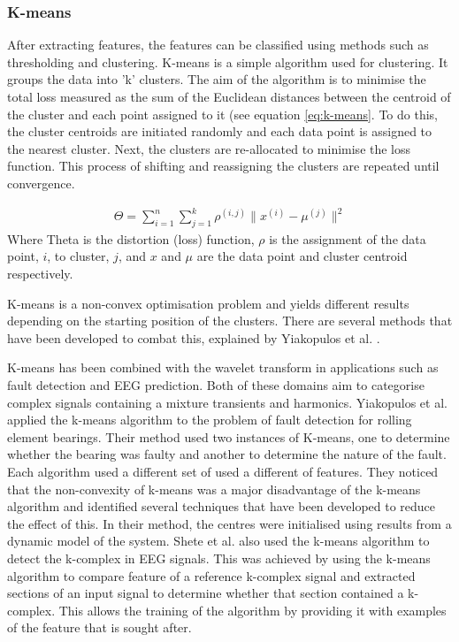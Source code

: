 \documentclass[reprint,NumberedRefs]{JASA}
\begin{document}
\subsubsection{K-means}
After extracting features, the features can be classified using methods such as thresholding and clustering. K-means is a simple algorithm used for clustering. It groups the data into 'k' clusters. The aim of the algorithm is to minimise the total loss measured as the sum of the Euclidean distances between the centroid of the cluster and each point assigned to it (see equation \ref{eq:k-means}. To do this, the cluster centroids are initiated randomly and each data point is assigned to the nearest cluster. Next, the clusters are re-allocated to minimise the loss function. This process of shifting and reassigning the clusters are repeated until convergence.

\begin{align}
\Theta = \sum_{i=1}^{n}{\sum_{j=1}^{k}{\rho^{(i,j)} \lVert x^{(i)} - \mu^{(j)} \rVert^2}}
\label{eq:k-means}
\end{align}
Where Theta is the distortion (loss) function, $\rho$ is the assignment of the data point, $i$, to cluster, $j$, and $x$ and $\mu$ are the data point and cluster centroid respectively.

K-means is a non-convex optimisation problem and yields different results depending on the starting position of the clusters. There are several methods that have been developed to combat this, explained by Yiakopulos et al. \cite{yiakopoulos2011rolling}.

K-means has been combined with the wavelet transform in applications such as fault detection and EEG prediction. Both of these domains aim to categorise complex signals containing a mixture transients and harmonics. Yiakopulos et al. \cite{yiakopoulos2011rolling} applied the k-means algorithm to the problem of fault detection for rolling element bearings. Their method used two instances of K-means, one to determine whether the bearing was faulty and another to determine the nature of the fault. Each algorithm used a different set of used a different of features. They noticed that the non-convexity of k-means was a major disadvantage of the k-means algorithm and identified several techniques that have been developed to reduce the effect of this.  In their method, the centres were initialised using results from a dynamic model of the system. Shete et al. \cite{shete2013k} also used the k-means algorithm to detect the k-complex in EEG signals. This was achieved by using the k-means algorithm to compare feature of a reference k-complex signal and extracted sections of an input signal to determine whether that section contained a k-complex. This allows the training of the algorithm by providing it with examples of the feature that is sought after.
\end{document}
